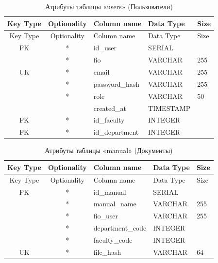 \begin{xltabular}{\textwidth}{|c|c|l|l|X|}
	\caption{Атрибуты таблицы «users» (Пользователи)\label{tab:users}}\\ \hline
	\centrow Key Type & \centrow Optionality & \centrow Column name & \centrow Data Type & \centrow Size \\ \hline
	\endfirsthead
	
	\centrow Key Type & \centrow Optionality & \centrow Column name & \centrow Data Type & \centrow Size \\ \hline
	\endhead
	
	PK & * & id\_user & SERIAL & \\ \hline
	& * & fio & VARCHAR & 255 \\ \hline
	UK & * & email & VARCHAR & 255 \\ \hline
	& * & password\_hash & VARCHAR & 255 \\ \hline
	& * & role & VARCHAR & 50 \\ \hline
	&  & created\_at & TIMESTAMP & \\ \hline
	FK & * & id\_faculty & INTEGER & \\ \hline
	FK & * & id\_department & INTEGER & \\ \hline
\end{xltabular}

\begin{xltabular}{\textwidth}{|c|c|l|l|X|}
	\caption{Атрибуты таблицы «manual» (Документы)\label{tab:manual}}\\ \hline
	\centrow Key Type & \centrow Optionality & \centrow Column name & \centrow Data Type & \centrow Size \\ \hline
	\endfirsthead
	
	\centrow Key Type & \centrow Optionality & \centrow Column name & \centrow Data Type & \centrow Size \\ \hline
	\endhead
	
	PK & * & id\_manual & SERIAL & \\ \hline
	& * & manual\_name & VARCHAR & 255 \\ \hline
	& * & fio\_user & VARCHAR & 255 \\ \hline
	& * & department\_code & INTEGER & \\ \hline
	& * & faculty\_code & INTEGER & \\ \hline
	UK & * & file\_hash & VARCHAR & 64 \\ \hline
\end{xltabular}


